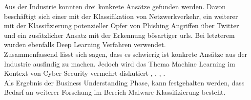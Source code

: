 \documentclass[
    12pt, %
    DIV10,
    ngerman, %
    a4paper, %
    oneside, %
    titlepage, %
    parskip=half, %
    headings=normal, %
    listof=totoc, %
    bibliography=totoc, %
    index=totoc, %
    captions=tableheading, %
    final %
]{scrreprt}
\begin{document}
Aus der Industrie konnten drei konkrete Ansätze gefunden werden. Davon beschäftigt sich einer mit der Klassifikation von Netzwerkverkehr, ein weiterer mit der Klassifizierung potenzieller Opfer von Phishing Angriffen über Twitter und ein  zusätzlicher Ansatz mit der Erkennung bösartiger \ac{urls}. Bei letzterem wurden ebenfalls Deep Learning Verfahren verwendet.\\
Zusammenfassend lässt sich sagen, dass es schwierig ist konkrete Ansätze aus der Industrie ausfindig zu machen. Jedoch wird das Thema Machine Learning im Kontext von Cyber Security vermehrt diskutiert \parencite{Pinto2014}, \parencite{Learning}, \parencite{Grieco2016}, \parencite{Clarencechio}.\\
Als Ergebnis der Business Understanding Phase, kann festgehalten werden, dass Bedarf an weiterer Forschung im Bereich Malware Klassifizierung besteht.
\end{document}
